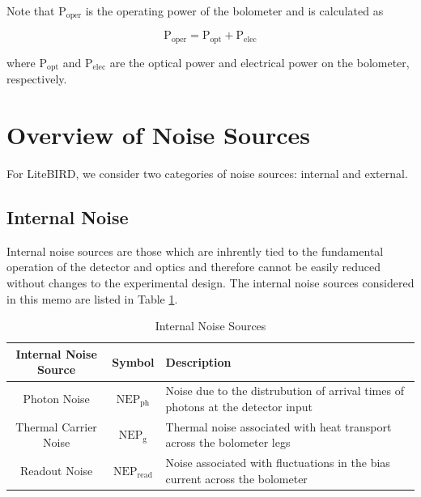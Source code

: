 \documentclass[12pt, titlepage]{article} %
\begin{document}
Note that $\mathrm{P_{oper}}$ is the operating power of the bolometer and is calculated as

\begin{equation}
	\mathrm{P_{oper} = P_{opt} + P_{elec}}
\end{equation}

where $\mathrm{P_{opt}}$ and $\mathrm{P_{elec}}$ are the optical power and electrical power on the bolometer, respectively.


\newpage

\section{Overview of Noise Sources}

For LiteBIRD, we consider two categories of noise sources: internal and external.


\subsection{Internal Noise}

Internal noise sources are those which are inhrently tied to the fundamental operation of the detector and optics and therefore cannot be easily reduced without changes to the experimental design. The internal noise sources considered in this memo are listed in Table \ref{table:IntNoiseSources}.

\begin{table}[H]
\centering
	\begin{tabularx}{\textwidth}{|| c | c | X ||}
	\hline
	Internal Noise Source & Symbol & Description \\
	\hline \hline
	Photon Noise & $\mathrm{NEP_{ph}}$ & Noise due to the distrubution of arrival times of photons at the detector input \cite{zmuidzinas} \\
	\hline
	Thermal Carrier Noise & $\mathrm{NEP_{g}}$ & Thermal noise associated with heat transport across the bolometer legs\\ 
	\hline
	Readout Noise & $\mathrm{NEP_{read}}$ & Noise associated with fluctuations in the bias current across the bolometer\\
	\hline
	\end{tabularx}
\caption{Internal Noise Sources \label{table:IntNoiseSources}}
\end{table}
\end{document}
